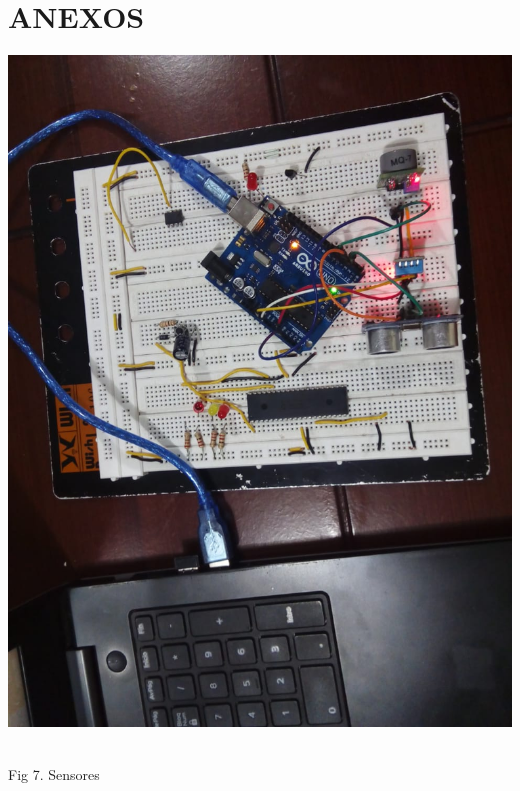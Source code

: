 \documentclass[12pt]{report}
\begin{document}
\section{ANEXOS}
 \begin{center}
\includegraphics[scale=0.25]{Documento/Figuras/Sensores.jpeg}
\begin{scriptsize}\\ 
Fig 7. Sensores
\end{scriptsize}
\end{center}
\end{document}
